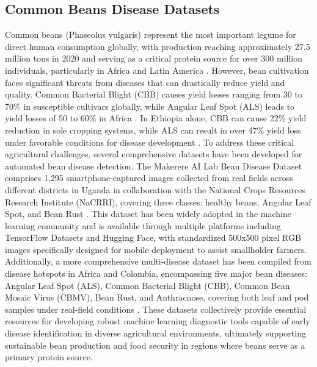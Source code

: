 \documentclass[sn-mathphys]{sn-jnl}
\theoremstyle{thmstyleone}%
\theoremstyle{thmstyletwo}%
\theoremstyle{thmstylethree}%
\begin{document}
\subsection{Common Beans Disease Datasets}
Common beans (Phaseolus vulgaris) represent the most important legume for direct human consumption globally, with production reaching approximately 27.5 million tons in 2020 and serving as a critical protein source for over 300 million individuals, particularly in Africa and Latin America \citep{kew2021common}. However, bean cultivation faces significant threats from diseases that can drastically reduce yield and quality. Common Bacterial Blight (CBB) causes yield losses ranging from 30 to 70\% in susceptible cultivars globally, while Angular Leaf Spot (ALS) leads to yield losses of 50 to 60\% in Africa \citep{gomez2024advancing}. In Ethiopia alone, CBB can cause 22\% yield reduction in sole cropping systems, while ALS can result in over 47\% yield loss under favorable conditions for disease development \citep{adugna2022evaluation}. To address these critical agricultural challenges, several comprehensive datasets have been developed for automated bean disease detection. The Makerere AI Lab Bean Disease Dataset comprises 1,295 smartphone-captured images collected from real fields across different districts in Uganda in collaboration with the National Crops Resources Research Institute (NaCRRI), covering three classes: healthy beans, Angular Leaf Spot, and Bean Rust \citep{makerere2020bean}. This dataset has been widely adopted in the machine learning community and is available through multiple platforms including TensorFlow Datasets and Hugging Face, with standardized 500x500 pixel RGB images specifically designed for mobile deployment to assist smallholder farmers. Additionally, a more comprehensive multi-disease dataset has been compiled from disease hotspots in Africa and Colombia, encompassing five major bean diseases: Angular Leaf Spot (ALS), Common Bacterial Blight (CBB), Common Bean Mosaic Virus (CBMV), Bean Rust, and Anthracnose, covering both leaf and pod samples under real-field conditions \citep{gomez2024advancing}. These datasets collectively provide essential resources for developing robust machine learning diagnostic tools capable of early disease identification in diverse agricultural environments, ultimately supporting sustainable bean production and food security in regions where beans serve as a primary protein source. 
\end{document}
